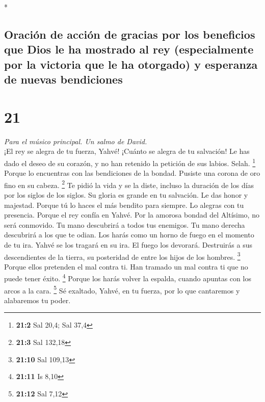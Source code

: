 \begin{paracol}{2}
\begin{otherlanguage}{english}
\end{otherlanguage}

\switchcolumn[0]*

\hypertarget{oraciuxf3n-de-acciuxf3n-de-gracias-por-los-beneficios-que-dios-le-ha-mostrado-al-rey-especialmente-por-la-victoria-que-le-ha-otorgado-y-esperanza-de-nuevas-bendiciones}{%
\subsection{Oración de acción de gracias por los beneficios que Dios le
ha mostrado al rey (especialmente por la victoria que le ha otorgado) y
esperanza de nuevas
bendiciones}\label{oraciuxf3n-de-acciuxf3n-de-gracias-por-los-beneficios-que-dios-le-ha-mostrado-al-rey-especialmente-por-la-victoria-que-le-ha-otorgado-y-esperanza-de-nuevas-bendiciones}}

\hypertarget{section-40}{%
\section{21}\label{section-40}}

\emph{Para el músico principal. Un salmo de David.}\\
 ¡El rey se alegra de tu fuerza, Yahvé! ¡Cuánto se alegra
de tu salvación!  Le has dado el deseo de su corazón, y no
han retenido la petición de sus labios. Selah. \footnote{\textbf{21:2}
  Sal 20,4; Sal 37,4}  Porque lo encuentras con las
bendiciones de la bondad. Pusiste una corona de oro fino en su cabeza.
\footnote{\textbf{21:3} Sal 132,18}  Te pidió la vida y se
la diste, incluso la duración de los días por los siglos de los siglos.
 Su gloria es grande en tu salvación. Le das honor y
majestad.  Porque tú lo haces el más bendito para siempre.
Lo alegras con tu presencia.  Porque el rey confía en
Yahvé. Por la amorosa bondad del Altísimo, no será conmovido.
 Tu mano descubrirá a todos tus enemigos. Tu mano derecha
descubrirá a los que te odian.  Los harás como un horno de
fuego en el momento de tu ira. Yahvé se los tragará en su ira. El fuego
los devorará.  Destruirás a sus descendientes de la
tierra, su posteridad de entre los hijos de los hombres. \footnote{\textbf{21:10}
  Sal 109,13}  Porque ellos pretenden el mal contra ti.
Han tramado un mal contra ti que no puede tener éxito. \footnote{\textbf{21:11}
  Is 8,10}  Porque los harás volver la espalda, cuando
apuntas con los arcos a la cara. \footnote{\textbf{21:12} Sal 7,12}
 Sé exaltado, Yahvé, en tu fuerza, por lo que cantaremos
y alabaremos tu poder.


\end{paracol}
